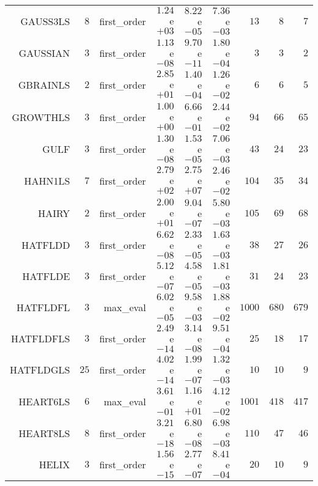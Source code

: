 \begin{longtable}{rrrrrrrrr}
GAUSS3LS & \(     8\) & first\_order & \( 1.24\)e\(+03\) & \( 8.22\)e\(-05\) & \( 7.36\)e\(-03\) & \(    13\) & \(     8\) & \(     7\) \\
GAUSSIAN & \(     3\) & first\_order & \( 1.13\)e\(-08\) & \( 9.70\)e\(-11\) & \( 1.80\)e\(-04\) & \(     3\) & \(     3\) & \(     2\) \\
GBRAINLS & \(     2\) & first\_order & \( 2.85\)e\(+01\) & \( 1.40\)e\(-04\) & \( 1.26\)e\(-02\) & \(     6\) & \(     6\) & \(     5\) \\
GROWTHLS & \(     3\) & first\_order & \( 1.00\)e\(+00\) & \( 6.66\)e\(-01\) & \( 2.44\)e\(-02\) & \(    94\) & \(    66\) & \(    65\) \\
GULF & \(     3\) & first\_order & \( 1.30\)e\(-08\) & \( 1.53\)e\(-05\) & \( 7.06\)e\(-03\) & \(    43\) & \(    24\) & \(    23\) \\
HAHN1LS & \(     7\) & first\_order & \( 2.79\)e\(+02\) & \( 2.75\)e\(+07\) & \( 2.46\)e\(-02\) & \(   104\) & \(    35\) & \(    34\) \\
HAIRY & \(     2\) & first\_order & \( 2.00\)e\(+01\) & \( 9.04\)e\(-07\) & \( 5.80\)e\(-03\) & \(   105\) & \(    69\) & \(    68\) \\
HATFLDD & \(     3\) & first\_order & \( 6.62\)e\(-08\) & \( 2.33\)e\(-05\) & \( 1.63\)e\(-03\) & \(    38\) & \(    27\) & \(    26\) \\
HATFLDE & \(     3\) & first\_order & \( 5.12\)e\(-07\) & \( 4.58\)e\(-05\) & \( 1.81\)e\(-03\) & \(    31\) & \(    24\) & \(    23\) \\
HATFLDFL & \(     3\) & max\_eval & \( 6.02\)e\(-05\) & \( 9.58\)e\(-03\) & \( 1.88\)e\(-02\) & \(  1000\) & \(   680\) & \(   679\) \\
HATFLDFLS & \(     3\) & first\_order & \( 2.49\)e\(-14\) & \( 3.14\)e\(-08\) & \( 9.51\)e\(-04\) & \(    25\) & \(    18\) & \(    17\) \\
HATFLDGLS & \(    25\) & first\_order & \( 4.02\)e\(-14\) & \( 1.99\)e\(-07\) & \( 1.32\)e\(-03\) & \(    10\) & \(    10\) & \(     9\) \\
HEART6LS & \(     6\) & max\_eval & \( 3.61\)e\(-01\) & \( 1.16\)e\(+01\) & \( 4.12\)e\(-02\) & \(  1001\) & \(   418\) & \(   417\) \\
HEART8LS & \(     8\) & first\_order & \( 3.21\)e\(-18\) & \( 6.80\)e\(-08\) & \( 6.98\)e\(-03\) & \(   110\) & \(    47\) & \(    46\) \\
HELIX & \(     3\) & first\_order & \( 1.56\)e\(-15\) & \( 2.77\)e\(-07\) & \( 8.41\)e\(-04\) & \(    20\) & \(    10\) & \(     9\) \\

\end{longtable}
